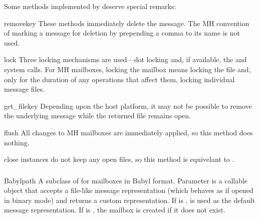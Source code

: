 Some  methods implemented by  deserve special remarks:

\begin{methoddesc}{remove}{key}
These methods immediately delete the message. The MH convention of marking a
message for deletion by prepending a comma to its name is not used.
\end{methoddesc}

\begin{methoddesc}{lock}{}
Three locking mechanisms are used---dot locking and, if available, the
 and  system calls. For MH mailboxes,
locking the mailbox means locking the  file and, only for
the duration of any operations that affect them, locking individual message
files.
\end{methoddesc}

\begin{methoddesc}{get_file}{key}
Depending upon the host platform, it may not be possible to remove the
underlying message while the returned file remains open.
\end{methoddesc}

\begin{methoddesc}{flush}{}
All changes to MH mailboxes are immediately applied, so this method does
nothing.
\end{methoddesc}

\begin{methoddesc}{close}{}
 instances do not keep any open files, so this method is equivelant
to .
\end{methoddesc}

\begin{seealso}
\end{seealso}

\subsubsection{}
\label{mailbox-babyl}

\begin{classdesc}{Babyl}{path}
A subclass of  for mailboxes in Babyl format. Parameter
 is a callable object that accepts a file-like message
representation (which behaves as if opened in binary mode) and returns a custom
representation. If  is ,  is used
as the default message representation. If  is , the
mailbox is created if it does not exist.
\end{classdesc}

